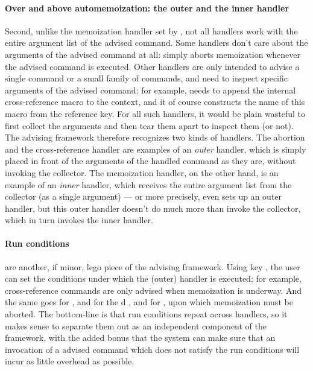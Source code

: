 \documentclass[a4paper,11pt]{article}
\begin{document}
\paragraph{Over and above automemoization: the outer and the inner handler}
Second, unlike the memoization handler set by , not all
handlers work with the entire argument list of the advised command.  Some
handlers don't care about the arguments of the advised command at all:
 simply aborts memoization whenever the advised command is
executed.  Other handlers are only intended to advise a single command or a
small family of commands, and need to inspect specific arguments of the advised
command: for example,  needs to append the internal
cross-reference macro to the context, and it of course constructs the name of
this macro from the reference key.  For all such handlers, it would be plain
wasteful to first collect the arguments and then tear them apart to inspect
them (or not).  The advising framework therefore recognizes two kinds of
handlers.  The abortion and the cross-reference handler are examples of an
\emph{outer} handler, which is simply placed in front of the arguments of the
handled command as they are, without invoking the collector.  The memoization
handler, on the other hand, is an example of an \emph{inner} handler, which
receives the entire argument list from the collector (as a single argument) ---
or more precisely, even  sets up an outer handler, but this
outer handler doesn't do much more than invoke the collector, which in turn
invokes the inner handler.

\paragraph*{Run conditions} are another, if minor, lego piece of the
advising framework.  Using key , the user can set the
conditions under which the (outer) handler is executed; for example,
cross-reference commands are only advised when memoization is underway.  And
the same goes for , and for the d
, and for , upon which memoization must be
aborted.  The bottom-line is that run conditions repeat across handlers, so
it makes sense to separate them out as an independent component of the
framework, with the added bonus that the system can make sure that an
invocation of a advised command which does not satisfy the run conditions
will incur as little overhead as possible.
\end{document}
